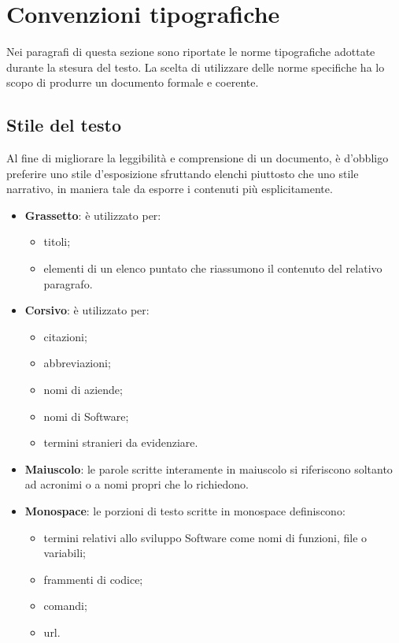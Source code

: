 \section{Convenzioni tipografiche}

Nei paragrafi di questa sezione sono riportate le norme tipografiche adottate durante la stesura del testo. La scelta di utilizzare delle norme specifiche ha lo scopo di produrre un documento formale e coerente.

\subsection{Stile del testo}
 Al fine di migliorare la leggibilità e comprensione di un documento, è d'obbligo preferire uno stile d'esposizione sfruttando elenchi piuttosto che uno stile narrativo, in maniera tale da esporre i contenuti più esplicitamente.
\begin{itemize}
	\item \textbf{Grassetto}: è utilizzato per:
	\begin{itemize}
		\item titoli;
		\item elementi di un elenco puntato che riassumono il contenuto del relativo paragrafo.
	\end{itemize}
	\item \textbf{Corsivo}: è utilizzato per:
	\begin{itemize}
		\item citazioni;
		\item abbreviazioni;
		\item nomi di aziende;
		\item nomi di Software;
		\item termini stranieri da evidenziare.
	\end{itemize}
	\item \textbf{Maiuscolo}: le parole scritte interamente in maiuscolo si riferiscono soltanto ad acronimi o a nomi propri che lo richiedono.
	\item \textbf{Monospace}: le porzioni di testo scritte in monospace definiscono:
	\begin{itemize}
		\item termini relativi allo sviluppo Software come nomi di funzioni, file o variabili;
		\item frammenti di codice;
		\item comandi;
		\item \gls{url}.
	\end{itemize}
\end{itemize}

